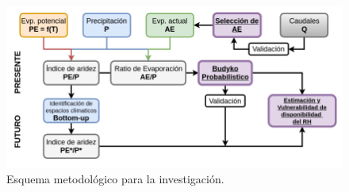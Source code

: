 \begin{figure}[ht]
	\includegraphics[scale=0.5]{Images/workflow.png}
	\centering
	\caption{Esquema metodológico para la investigación.}
	\label{fig:workflow}
\end{figure}